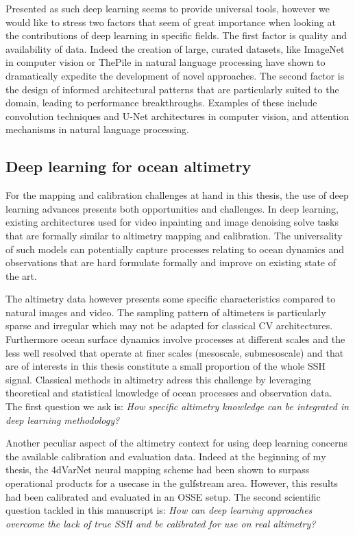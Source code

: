 \begin{bibunit}
Presented as such deep learning seems to provide universal tools,  
however we would like to stress two factors that seem of great importance when looking at the contributions of deep learning in specific fields.
The first factor is quality and availability of data.
Indeed the creation of large, curated datasets, like ImageNet\cite{} in computer vision or ThePile\cite{} in natural language processing have shown to dramatically expedite the development of novel approaches. 
The second factor is the design of informed architectural patterns that are particularly suited to the domain, leading to performance breakthroughs.
Examples of these include convolution techniques\cite{} and U-Net architectures\cite{} in computer vision, and attention mechanisms\cite{} in natural language processing.


\subsection{Deep learning for ocean altimetry}
For the mapping and calibration challenges at hand in this thesis, the use of deep learning advances presents both opportunities and challenges.
In deep learning, existing architectures used for video inpainting\cite{} and image denoising\cite{} solve tasks that are formally similar to altimetry mapping and calibration.
The universality of such models can potentially capture processes relating to ocean dynamics and observations that are hard formulate formally and improve on existing state of the art.

The altimetry data however presents some specific characteristics compared to natural images and video.
The sampling pattern of altimeters is particularly sparse and irregular which may not be adapted for classical CV architectures.
Furthermore ocean surface dynamics involve processes at different scales and the less well resolved that operate at finer scales (mesoscale, submesoscale) and that are of interests in this thesis constitute a small proportion of the whole SSH signal.
Classical methods in altimetry adress this challenge by leveraging theoretical and statistical knowledge of ocean processes and observation data.
The first question we ask is: \textit{How specific altimetry knowledge can be integrated in deep learning methodology?}

Another peculiar aspect of the altimetry context for using deep learning concerns the available calibration and evaluation data.
Indeed at the beginning of my thesis, the 4dVarNet neural mapping scheme had been shown to surpass operational products for a usecase in the gulfstream area\cite{}. However, this results had been calibrated and evaluated in an OSSE setup. 
The second scientific question tackled in this manuscript is: \textit{How can deep learning approaches overcome the lack of true SSH and be calibrated for use on real altimetry?}



\end{bibunit}
